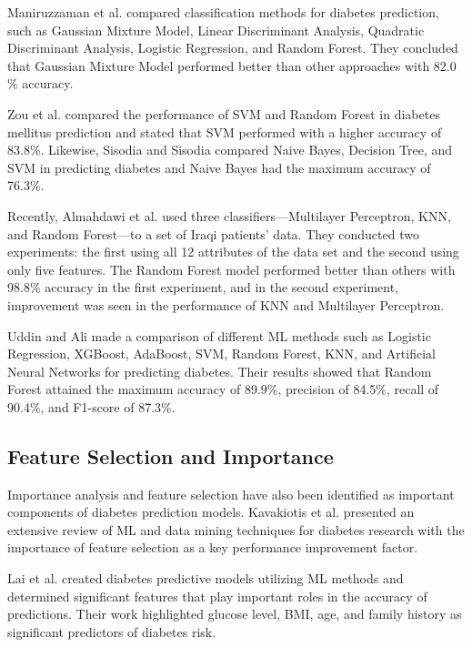 \documentclass[conference]{IEEEtran}
\begin{document}
Maniruzzaman et al. \cite{maniruzzaman2017} compared classification methods for diabetes prediction, such as Gaussian Mixture Model, Linear Discriminant Analysis, Quadratic Discriminant Analysis, Logistic Regression, and Random Forest. They concluded that Gaussian Mixture Model performed better than other approaches with 82.0\\\% accuracy.

Zou et al. \cite{zou2018} compared the performance of SVM and Random Forest in diabetes mellitus prediction and stated that SVM performed with a higher accuracy of 83.8\%. Likewise, Sisodia and Sisodia \cite{sisodia2018} compared Naive Bayes, Decision Tree, and SVM in predicting diabetes and Naive Bayes had the maximum accuracy of 76.3\%.

Recently, Almahdawi et al. \cite{almahdawi2023} used three classifiers—Multilayer Perceptron, KNN, and Random Forest—to a set of Iraqi patients' data. They conducted two experiments: the first using all 12 attributes of the data set and the second using only five features. The Random Forest model performed better than others with 98.8\% accuracy in the first experiment, and in the second experiment, improvement was seen in the performance of KNN and Multilayer Perceptron.

Uddin and Ali \cite{uddin2023} made a comparison of different ML methods such as Logistic Regression, XGBoost, AdaBoost, SVM, Random Forest, KNN, and Artificial Neural Networks for predicting diabetes. Their results showed that Random Forest attained the maximum accuracy of 89.9\%, precision of 84.5\%, recall of 90.4\%, and F1-score of 87.3\%.

\subsection{Feature Selection and Importance}
Importance analysis and feature selection have also been identified as important components of diabetes prediction models. Kavakiotis et al. \cite{kavakiotis2017} presented an extensive review of ML and data mining techniques for diabetes research with the importance of feature selection as a key performance improvement factor.

Lai et al. \cite{lai2019} created diabetes predictive models utilizing ML methods and determined significant features that play important roles in the accuracy of predictions. Their work highlighted glucose level, BMI, age, and family history as significant predictors of diabetes risk.
\end{document}

